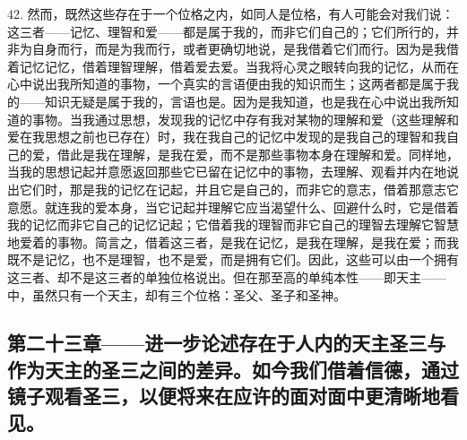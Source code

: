 42. 然而，既然这些存在于一个位格之内，如同人是位格，有人可能会对我们说：这三者——记忆、理智和爱——都是属于我的，而非它们自己的；它们所行的，并非为自身而行，而是为我而行，或者更确切地说，是我借着它们而行。因为是我借着记忆记忆，借着理智理解，借着爱去爱。当我将心灵之眼转向我的记忆，从而在心中说出我所知道的事物，一个真实的言语便由我的知识而生；这两者都是属于我的——知识无疑是属于我的，言语也是。因为是我知道，也是我在心中说出我所知道的事物。当我通过思想，发现我的记忆中存有我对某物的理解和爱（这些理解和爱在我思想之前也已存在）时，我在我自己的记忆中发现的是我自己的理智和我自己的爱，借此是我在理解，是我在爱，而不是那些事物本身在理解和爱。同样地，当我的思想记起并意愿返回那些它已留在记忆中的事物，去理解、观看并内在地说出它们时，那是我的记忆在记起，并且它是自己的，而非它的意志，借着那意志它意愿。就连我的爱本身，当它记起并理解它应当渴望什么、回避什么时，它是借着我的记忆而非它自己的记忆记起；它借着我的理智而非它自己的理智去理解它智慧地爱着的事物。简言之，借着这三者，是我在记忆，是我在理解，是我在爱；而我既不是记忆，也不是理智，也不是爱，而是拥有它们。因此，这些可以由一个拥有这三者、却不是这三者的单独位格说出。但在那至高的单纯本性——即天主——中，虽然只有一个天主，却有三个位格：圣父、圣子和圣神。\par


\subsection{第二十三章——进一步论述存在于人内的天主圣三与作为天主的圣三之间的差异。如今我们借着信德，通过镜子观看圣三，以便将来在应许的面对面中更清晰地看见。}

